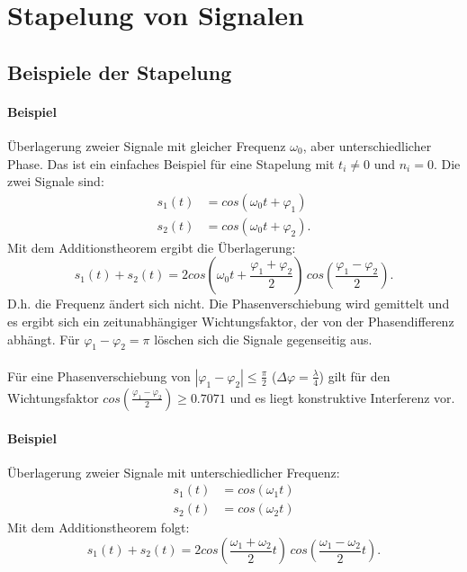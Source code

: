 \chapter{Stapelung von Signalen}

\section{Beispiele der Stapelung}
\subsubsection*{Beispiel}
Überlagerung zweier Signale mit gleicher Frequenz $\omega_0$, aber unterschiedlicher Phase.  Das ist ein einfaches Beispiel für eine Stapelung mit $t_i\not= 0$ und $n_i=0$. Die zwei Signale sind:
\begin{align*}
s_1(t) & =cos(\omega_0 t+\varphi_1)\\
s_2(t) & =cos(\omega_0 t+\varphi_2).
\end{align*}
Mit dem Additionstheorem ergibt die Überlagerung:
\begin{equation}
s_1(t)+s_2(t)=2cos\left(\omega_0 t + \frac {\varphi_1 + \varphi_2}{2}\right)\,cos\left(\frac {\varphi_1 - \varphi_2}{2}\right).
\end{equation}
D.h. die Frequenz ändert sich nicht. Die Phasenverschiebung wird gemittelt und es ergibt sich ein zeitunabhängiger Wichtungsfaktor, der von der Phasendifferenz abhängt. Für $\varphi_1-\varphi_2= \pi $ löschen sich die Signale gegenseitig aus.\\\\
Für eine Phasenverschiebung von $|\varphi_1-\varphi_2|\le \frac{\pi}{2}$ ($\Delta\varphi = \frac{\lambda}{4}$) gilt für den Wichtungsfaktor $cos(\frac{\varphi_1-\varphi_2}{2})\ge 0.7071$ und es liegt konstruktive Interferenz vor.\\ 

\subsubsection*{Beispiel}
Überlagerung zweier Signale mit unterschiedlicher Frequenz:
\begin{align*}
s_1(t) & =cos(\omega_1 t)\\
s_2(t) &=cos(\omega_2 t)
\end{align*}
Mit dem Additionstheorem folgt:
\begin{equation}
s_1(t)+s_2(t)= 2 cos\left(\frac{\omega_1+\omega_2}{2}t\right)\,cos\left(\frac{\omega_1-\omega_2}{2}t\right).
\end{equation}

